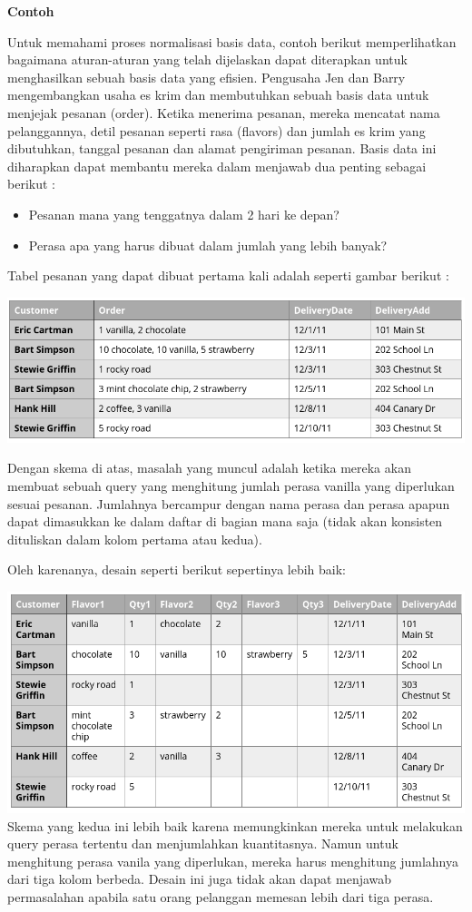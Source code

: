 \documentclass[]{book}
\providecommand{\tightlist}{%
  \setlength{\itemsep}{0pt}\setlength{\parskip}{0pt}}
\begin{document}
\textbf{Contoh}

Untuk memahami proses normalisasi basis data, contoh berikut memperlihatkan bagaimana aturan-aturan yang telah dijelaskan dapat diterapkan untuk menghasilkan sebuah basis data yang efisien. Pengusaha Jen dan Barry mengembangkan usaha es krim dan membutuhkan sebuah basis data untuk menjejak pesanan (order). Ketika menerima pesanan, mereka mencatat nama pelanggannya, detil pesanan seperti rasa (flavors) dan jumlah es krim yang dibutuhkan, tanggal pesanan dan alamat pengiriman pesanan. Basis data ini diharapkan dapat membantu mereka dalam menjawab dua penting sebagai berikut :

\begin{itemize}
\tightlist
\item
  Pesanan mana yang tenggatnya dalam 2 hari ke depan?
\item
  Perasa apa yang harus dibuat dalam jumlah yang lebih banyak?
\end{itemize}

Tabel pesanan yang dapat dibuat pertama kali adalah seperti gambar berikut :

\includegraphics{./img/tab01_order.png}

Dengan skema di atas, masalah yang muncul adalah ketika mereka akan membuat sebuah query yang menghitung jumlah perasa vanilla yang diperlukan sesuai pesanan. Jumlahnya bercampur dengan nama perasa dan perasa apapun dapat dimasukkan ke dalam daftar di bagian mana saja (tidak akan konsisten dituliskan dalam kolom pertama atau kedua).

Oleh karenanya, desain seperti berikut sepertinya lebih baik:

\includegraphics{./img/tab02a_order.png}
Skema yang kedua ini lebih baik karena memungkinkan mereka untuk melakukan query perasa tertentu dan menjumlahkan kuantitasnya. Namun untuk menghitung perasa vanila yang diperlukan, mereka harus menghitung jumlahnya dari tiga kolom berbeda. Desain ini juga tidak akan dapat menjawab permasalahan apabila satu orang pelanggan memesan lebih dari tiga perasa.
\end{document}
